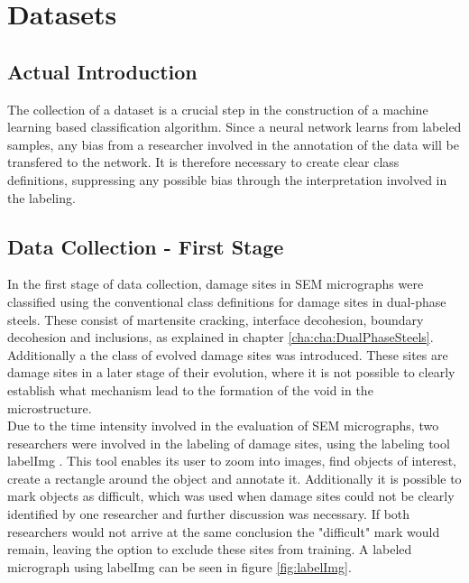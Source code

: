 \chapter{Datasets}


\section{Actual Introduction}

The collection of a dataset is a crucial step in the construction of a machine learning based classification algorithm. Since a neural network learns from labeled samples, any bias from a researcher involved in the annotation of the data will be transfered to the network. It is therefore necessary to create clear class definitions, suppressing any possible bias through the interpretation involved in the labeling. 




\section{Data Collection - First Stage}
In the first stage of data collection, damage sites in SEM micrographs were classified using the conventional class definitions for damage sites in dual-phase steels. These consist of martensite cracking, interface decohesion, boundary decohesion and inclusions, as explained in chapter \ref{cha:cha:DualPhaseSteels}. Additionally a the class of evolved damage sites was introduced. These sites are damage sites in a later stage of their evolution, where it is not possible to clearly establish what mechanism lead to the formation of the void in the microstructure. \\



Due to the time intensity involved in the evaluation of SEM micrographs, two researchers were involved in the labeling of damage sites, using the labeling tool labelImg \cite{labelImg}. This tool enables its user to zoom into images, find objects of interest, create a rectangle around the object and annotate it. Additionally it is possible to mark objects as difficult, which was used when damage sites could not be clearly identified by one researcher and further discussion was necessary. If both researchers would not arrive at the same conclusion the "difficult" mark would remain, leaving the option to exclude these sites from training. A labeled micrograph using labelImg can be seen in figure \ref{fig:labelImg}. 

